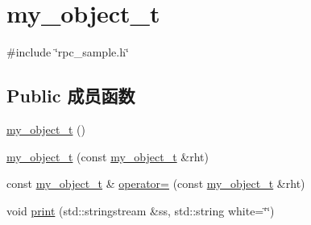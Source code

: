 \hypertarget{structrpc__sample_1_1my__object__t}{}\section{my\+\_\+object\+\_\+t}
\label{structrpc__sample_1_1my__object__t}


{\ttfamily \#include \char`\"{}rpc\+\_\+sample.\+h\char`\"{}}

\subsection*{Public 成员函数}
\begin{DoxyCompactItemize}
\item 
\hyperlink{structrpc__sample_1_1my__object__t_a97bcc8d2b802b19e262555ad2353edc5}{my\+\_\+object\+\_\+t} ()
\item 
\hyperlink{structrpc__sample_1_1my__object__t_aa30ab67f88d4d74be10d684073c74bed}{my\+\_\+object\+\_\+t} (const \hyperlink{structrpc__sample_1_1my__object__t}{my\+\_\+object\+\_\+t} \&rht)
\item 
const \hyperlink{structrpc__sample_1_1my__object__t}{my\+\_\+object\+\_\+t} \& \hyperlink{structrpc__sample_1_1my__object__t_a3eb77592cbd8c158afe2b82dfbe8c856}{operator=} (const \hyperlink{structrpc__sample_1_1my__object__t}{my\+\_\+object\+\_\+t} \&rht)
\item 
void \hyperlink{structrpc__sample_1_1my__object__t_a2f718b12c2666105404ac2314de6e5e7}{print} (std\+::stringstream \&ss, std\+::string white=\char`\"{}\char`\"{})
\end{DoxyCompactItemize}
